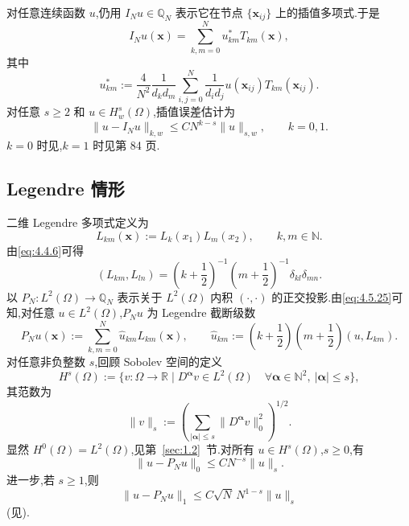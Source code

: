 对任意连续函数 \(u\),仍用 \(I_Nu\in\mathbb Q_N\) 表示它在节点 \(\{\boldsymbol{x}_{ij}\}\) 上的插值多项式.于是
\begin{equation}\label{eq:4.5.22}
  I_Nu(\boldsymbol{x})=\sum_{k,m=0}^N u_{km}^*T_{km}(\boldsymbol{x}),
\end{equation}
其中
\[
  u_{km}^*:=\frac4{N^2}\frac1{d_kd_m}\sum_{i,j=0}^N
     \frac1{d_id_j}u(\boldsymbol{x}_{ij})T_{km}(\boldsymbol{x}_{ij}).
\]
对任意 \(s\ge2\) 和 \(u\in H_w^s(\Omega)\),插值误差估计为
\begin{equation}\label{eq:4.5.23}
  \|u-I_Nu\|_{k,w}\le CN^{k-s}\|u\|_{s,w},\qquad k=0,1.
\end{equation}
\(k=0\) 时见,\(k=1\) 时见第 84 页.

\subsection{Legendre 情形}\label{sec:4.5.2}

二维 Legendre 多项式定义为
\begin{equation}\label{eq:4.5.24}
  L_{km}(\boldsymbol{x}):=L_k(x_1)L_m(x_2),\qquad k,m\in\mathbb N.
\end{equation}
由\eqref{eq:4.4.6}可得
\begin{equation}\label{eq:4.5.25}
  (L_{km},L_{ln})=\left(k+\frac12\right)^{-1}
                 \left(m+\frac12\right)^{-1}\delta_{kl}\delta_{mn}.
\end{equation}
以 \(P_N\colon L^2(\Omega)\to\mathbb Q_N\) 表示关于 \(L^2(\Omega)\) 内积 \((\cdot,\cdot)\) 的正交投影.由\eqref{eq:4.5.25}可知,对任意 \(u\in L^2(\Omega)\),\(P_Nu\) 为 Legendre 截断级数
\begin{equation}\label{eq:4.5.26}
  P_Nu(\boldsymbol{x}):=\sum_{k,m=0}^N\widehat u_{km}L_{km}(\boldsymbol{x}),
  \qquad
  \widehat u_{km}:=\left(k+\frac12\right)\left(m+\frac12\right)(u,L_{km}).
\end{equation}
对任意非负整数 \(s\),回顾 Sobolev 空间的定义
\begin{equation}\label{eq:4.5.27}
  H^s(\Omega):=\{v\colon\Omega\to\mathbb R\mid
    D^{\boldsymbol{\alpha}}v\in L^2(\Omega)\quad
    \forall\boldsymbol{\alpha}\in\mathbb N^2,\ |\boldsymbol{\alpha}|\le s\},
\end{equation}
其范数为
\begin{equation}\label{eq:4.5.28}
  \|v\|_s:=\left(\sum_{|\boldsymbol{\alpha}|\le s}
                       \|D^{\boldsymbol{\alpha}}v\|_0^2\right)^{1/2}.
\end{equation}
显然 \(H^0(\Omega)=L^2(\Omega)\),见第~\ref{sec:1.2}~节.对所有 \(u\in H^s(\Omega)\),\(s\ge0\),有
\begin{equation}\label{eq:4.5.29}
  \|u-P_Nu\|_0\le CN^{-s}\|u\|_s.
\end{equation}
进一步,若 \(s\ge1\),则
\begin{equation}\label{eq:4.5.30}
  \|u-P_Nu\|_1\le C\sqrt N\,N^{1-s}\|u\|_s
\end{equation}
(见).


